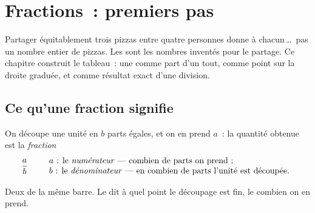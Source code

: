 \chapter{Fractions~: premiers pas}\label{ch:g6:fractions}

Partager équitablement trois pizzas entre quatre personnes donne à
chacun\,\dots\ pas un nombre entier de pizzas. Les  sont les
nombres inventés pour le partage. Ce chapitre construit le tableau~: une
 comme part d'un tout, comme point sur la droite graduée, et
comme résultat exact d'une division.

\section{Ce qu'une fraction signifie}

\begin{definition}[Fraction]\label{def:g6:fractions:def}
On découpe une unité en $b$ parts égales, et on en prend $a$~: la
quantité obtenue est la \emph{fraction}
\[
\frac{a}{b}
\qquad
\begin{array}{l}
a \text{~: le \emph{numérateur} --- combien de parts on prend~;}\\
b \text{~: le \emph{dénominateur} --- en combien de parts l'unité est découpée.}
\end{array}
\]
\end{definition}

\begin{omfigure}

{\small Deux  de la même barre. Le  dit à quel
point le découpage est fin, le  combien on en prend.}
\end{omfigure}

